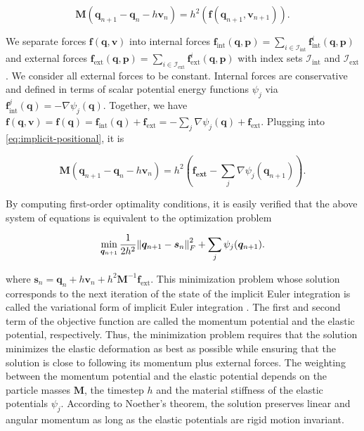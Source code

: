 \begin{equation}\label{eq:implicit-positional}
    \bm{M}(\bm{q}_{n+1} - \bm{q}_n - h\bm{v}_n) = h^2(\bm{f}(\bm{q}_{n+1}, \bm{v}_{n+1})).
\end{equation}

\noindent We separate forces $\bm{f}(\bm{q}, \bm{v})$ into internal forces $\bm{f}_{\text{int}}(\bm{q}, \bm{p}) = \sum_{i \in \mathcal{I}_{\text{int}}} 
\bm{f}^i_{\text{int}}
(\bm{q}, \bm{p})$ and external forces $\bm{f}_{\text{ext}}(\bm{q}, \bm{p}) = \sum_{i \in \mathcal{I}_{\text{ext}}} \bm{f}^i_{\text{ext}}(\bm{q}, 
\bm{p})$ with index sets $\mathcal{I}_{\text{int}}$ and $\mathcal{I}_{\text{ext}}$. We consider all external forces to be constant. Internal forces 
are conservative and defined in terms of scalar potential energy functions 
$\psi_j$ via $\bm{f}^j_{\text{int}}(\bm{q}) = -\nabla \psi_j(\bm{q})$. Together, we have $\bm{f}(\bm{q}, \bm{v}) = \bm{f} (\bm{q}) 
= \bm{f}_{\text{int}} (\bm{q}) + \bm{f}_{\text{ext}} = -\sum_j \nabla \psi_j(\bm{q}) + \bm{f}_{\text{ext}}$. Plugging into 
\cref{eq:implicit-positional}, it is

\begin{equation}\label{eq:implicit-positional-detailed}
    \bm{M}(\bm{q}_{n+1} - \bm{q}_n - h\bm{v}_n) = h^2(\bm{f_\text{ext}} - \sum_j \nabla \psi_j(\bm{q}_{n+1})).
\end{equation}

\noindent By computing first-order optimality conditions, it is easily verified that the above system of equations is equivalent to the optimization 
problem

\begin{equation}\label{eq:variational-implicit}
    \min_{\bm{q}_{n+1}} \frac{1}{2h^2} \norm{\bm{q}_{n+1} - \bm{s}_n}^2_F + \sum_j \psi_j(\bm{q}_{n+1}).
\end{equation}

\noindent where $\bm{s}_n = \bm{q}_n + h\bm{v}_n + h^2\bm{M}^{-1}\bm{f}_{\text{ext}}$. This minimization problem whose solution corresponds to the next
iteration of the state of the implicit Euler integration is called the variational form of implicit Euler integration \cite{bouaziz2014}. 
The first and second term of the objective function are called the momentum potential and the elastic potential, respectively. Thus, the 
minimization problem requires that the solution minimizes the elastic deformation as best as possible while ensuring that the solution is 
close to following its momentum plus external forces. The weighting between the momentum potential and the elastic potential depends on the 
particle masses $\bm{M}$, the timestep $h$ and the material stiffness of the elastic potentials $\psi_j$. According to Noether's theorem, 
the solution preserves linear and angular momentum as long as the elastic potentials are rigid motion invariant.

